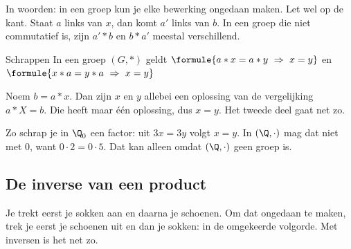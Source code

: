 In woorden: in een groep kun je elke bewerking ongedaan maken. Let wel op de kant. Staat $a$ links van $x$, dan komt $a'$ links van $b$. In een groep die niet commutatief is, zijn $a' \ast b$ en $b \ast a'$ meestal verschillend.


\begin{theorie}
\begin{stelling}{Schrappen}
In een groep $(G, \ast)$ geldt \quad $\formule{a \ast x = a \ast y \ \Rightarrow \ x = y}$ \quad en \quad $\formule{x \ast a = y \ast a \ \Rightarrow \ x = y}$
\end{stelling}

\begin{bewijs}
Noem $b = a \ast x$. Dan zijn $x$ en $y$ allebei een oplossing van de vergelijking $a \ast X = b$. Die heeft maar één oplossing, dus $x = y$. Het tweede deel gaat net zo.
\end{bewijs}
\end{theorie}

Zo schrap je in $\Q_0$ een factor: uit $3x = 3y$ volgt $x = y$. In $(\Q, \cdot)$ mag dat niet met 0, want $0 \cdot 2 = 0 \cdot 5$. Dat kan alleen omdat $(\Q, \cdot)$ geen groep is.

\subsection{De inverse van een product}

Je trekt eerst je sokken aan en daarna je schoenen. Om dat ongedaan te maken, trek je eerst je schoenen uit en dan je sokken: in de omgekeerde volgorde. Met inversen is het net zo.

